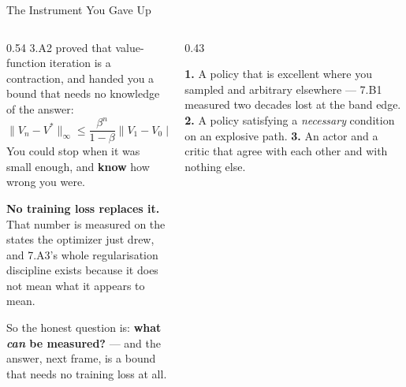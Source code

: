 \begin{frame}{The Instrument You Gave Up}
\begin{columns}[T]
\begin{column}{0.54\textwidth}
\small
3.A2 proved that value-function iteration is a contraction, and handed you a bound that needs no knowledge of the answer:
\[
  \lVert V_n-V^{*}\rVert_\infty\le\frac{\beta^{n}}{1-\beta}\lVert V_1-V_0\rVert_\infty .
\]
You could stop when it was small enough, and \textbf{know} how wrong you were.
\medskip

\textbf{No training loss replaces it.} That number is measured on the states the optimizer just drew, and 7.A3's whole regularisation discipline exists because it does not mean what it appears to mean.
\medskip

So the honest question is: \textbf{what \emph{can} be measured?} --- and the answer, next frame, is a bound that needs no training loss at all.
\end{column}
\begin{column}{0.43\textwidth}
\begin{cautionbox}[title=\textbf{Three things a small loss is consistent with}]\small
\textbf{1.} A policy that is excellent where you sampled and arbitrary elsewhere --- 7.B1 measured two decades lost at the band edge.
\medskip
\textbf{2.} A policy satisfying a \emph{necessary} condition on an explosive path.
\medskip
\textbf{3.} An actor and a critic that agree with each other and with nothing else.
\end{cautionbox}
\end{column}
\end{columns}
\vspace{1mm}
\end{frame}

